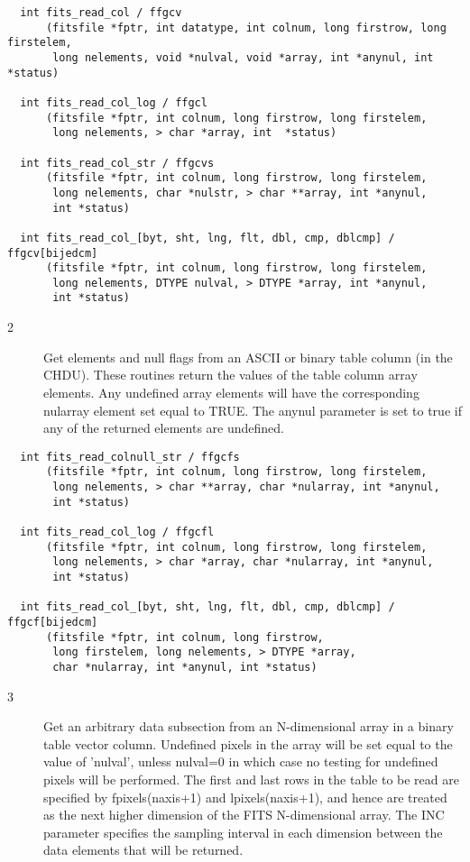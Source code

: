 \begin{verbatim}
  int fits_read_col / ffgcv
      (fitsfile *fptr, int datatype, int colnum, long firstrow, long firstelem,
       long nelements, void *nulval, void *array, int *anynul, int *status)

  int fits_read_col_log / ffgcl
      (fitsfile *fptr, int colnum, long firstrow, long firstelem,
       long nelements, > char *array, int  *status)

  int fits_read_col_str / ffgcvs
      (fitsfile *fptr, int colnum, long firstrow, long firstelem,
       long nelements, char *nulstr, > char **array, int *anynul,
       int *status)

  int fits_read_col_[byt, sht, lng, flt, dbl, cmp, dblcmp] / ffgcv[bijedcm]
      (fitsfile *fptr, int colnum, long firstrow, long firstelem,
       long nelements, DTYPE nulval, > DTYPE *array, int *anynul,
       int *status)
\end{verbatim}

\begin{description}
\item[2 ]  Get elements and null flags from an ASCII or binary table column (in the
    CHDU).  These routines return the values of the table column array elements.
    Any undefined array elements will have the corresponding nularray element
    set equal to TRUE.  The anynul parameter is set to true if any of the
   returned elements are undefined.
\end{description}

\begin{verbatim}
  int fits_read_colnull_str / ffgcfs
      (fitsfile *fptr, int colnum, long firstrow, long firstelem,
       long nelements, > char **array, char *nularray, int *anynul,
       int *status)

  int fits_read_col_log / ffgcfl
      (fitsfile *fptr, int colnum, long firstrow, long firstelem,
       long nelements, > char *array, char *nularray, int *anynul,
       int *status)

  int fits_read_col_[byt, sht, lng, flt, dbl, cmp, dblcmp] / ffgcf[bijedcm]
      (fitsfile *fptr, int colnum, long firstrow,
       long firstelem, long nelements, > DTYPE *array,
       char *nularray, int *anynul, int *status)
\end{verbatim}

\begin{description}
\item[3 ] Get an arbitrary data subsection from an N-dimensional array
    in a binary table vector column.  Undefined pixels
    in the array will be set equal to the value of 'nulval',
    unless nulval=0 in which case no testing for undefined pixels will
    be performed.  The first and last rows in the table to be read
    are specified by fpixels(naxis+1) and lpixels(naxis+1), and hence
    are treated as the next higher dimension of the FITS N-dimensional
    array.  The INC parameter specifies the sampling interval in
   each dimension between the data elements that will be returned.
\end{description}

